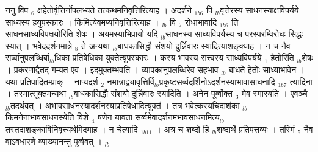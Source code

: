 \documentclass[article,12pt,a4paper]{memoir}%
\newcounter{parCount}
\begin{document}
	  
	  \pstart \leavevmode%
	ननु विप {\tiny $_{6}$} क्षहेतोर्वृत्तिर्नोपलभ्यते तत्कथमनिवृत्तिरित्याह । {\color{DodgerBlue3}अदर्शने {\tiny $_{1b6}$} पि} {\tiny $_{lb}$}वृत्तेरस्य साधनस्याक्षविपर्यये साध्यस्य हयुपस्कारः । किमित्येवमप्यनिवृत्तिरित्याह । {\tiny $_{lb}$} {\color{DodgerBlue3}वि {\tiny $_{7}$} रोधाभावादि} {\tiny $_{1b6}$} ति । साधनसाध्यविपक्षयोरिति शेषः । अयमस्याभिप्रायो यदि {\tiny $_{lb}$}साधनस्य साध्यविपर्यस्य च परस्परम्विरोधः सिद्धः स्यात् । भवेददर्शनमात्रे {\tiny $_{8}$} \leavevmode{} ते अन्यथा {\tiny $_{lb}$}बाधकासिद्धौ संशयो दुर्न्निवारः स्यादित्याशङ्क्याह । न च नैव सर्व्वानुपलब्धिर्बा{\tiny $_{lb}$}धिका प्रतिषेधिका युक्तेत्युपस्कारः । कस्य भावस्य सत्त्वस्य साध्यविपर्यये {\tiny $_{1}$} हेतोरिति {\tiny $_{lb}$}शेषः । प्रकरणाद्वैतद् गम्यत एव । इदमुक्तम्भवति । व्यापकानुपलब्धिरेव सहभाव {\tiny $_{lb}$} \leavevmode{} बाधते हेतोः साध्याभावेन । यथा प्रतिपादितम्प्राक् । {\color{DodgerBlue3}नाप्यदर्श {\tiny $_{2}$} नमात्राद्व्यावृत्तिर्वि{\tiny $_{lb}$}प्रकृष्टसर्व्वदर्शिनोऽदर्शनस्याभावासाधनादि} {\tiny $_{1b7}$} त्यादिना । तस्मात्सूक्तमन्यथा {\tiny $_{lb}$}बाधकासिद्धौ संशयो दुर्न्निवारः स्यादिति । अनेन पूर्व्वोक्त {\tiny $_{3}$} मेव स्मारयति । एवञ्चै {\tiny $_{lb}$}तदर्थवत् । अभावसाधनस्यादर्शनस्याप्रतिषेधादित्युक्तं । तत्र भवेत्कस्यचिदाशंका {\tiny $_{lb}$}किमनेनाभावसाधनस्येति विशे {\tiny $_{4}$} षणेन यावता सर्व्वमेवादर्शनमभावसाधनमित्य{\tiny $_{lb}$}तस्तदाशङ्काविनिवृत्त्यर्थमिदमाह । {\color{DodgerBlue3}न चेत्यादि} {\tiny $_{1b11}$} । अत्र च शब्दो हि {\tiny $_{lb}$}शब्दार्थे प्रतिपत्तव्यः । तस्मिं {\tiny $_{5}$} नैव वाऽवधारणे व्याख्यानन्तु पूर्व्ववत् ।
	{}
	\pend%
      {\tiny $_{lb}$}
\end{document}
